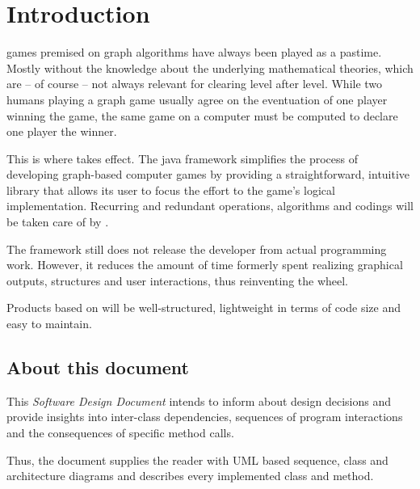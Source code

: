 \section{Introduction}
\Glspl{game} premised on \gls{graph} \glspl{algorithm} have always been played as a pastime. Mostly without the knowledge about the underlying mathematical theories, which are -- of course -- not always relevant for clearing \gls{level} after level. While two humans playing a graph game usually agree on the eventuation of one player winning the game, the same game on a computer must be computed to declare one \gls{player} the winner.\par

This is where \graphioli takes effect. The \Gls{java} \gls{framework} simplifies the process of developing graph-based computer games by providing a straightforward, intuitive \gls{library} that allows its user to focus the effort to the game's logical implementation. Recurring and redundant operations, algorithms and codings will be taken care of by \graphioli.\par

The framework still does not release the \gls{developer} from actual programming work. However, it reduces the amount of time formerly spent realizing graphical outputs, structures and user interactions, thus reinventing the wheel.\par

Products based on \graphioli will be well-structured, lightweight in terms of code size and easy to maintain.\par

\subsection{About this document}

This \emph{Software Design Document} intends to inform about design decisions and provide insights into inter-class dependencies, sequences of program interactions and the consequences of specific method calls.\par
Thus, the document supplies the reader with \gls{UML} based sequence, class and architecture diagrams and describes every implemented class and method.